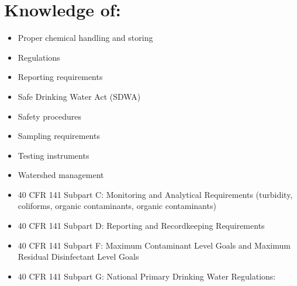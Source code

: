 \documentclass[10pt]{article}
\begin{document}
\section{Knowledge of:}
\begin{itemize}
  \item Proper chemical handling and storing

  \item Regulations

  \item Reporting requirements

  \item Safe Drinking Water Act (SDWA)

  \item Safety procedures

  \item Sampling requirements

  \item Testing instruments

  \item Watershed management

  \item 40 CFR 141 Subpart C: Monitoring and Analytical Requirements (turbidity, coliforms, organic contaminants, organic contaminants)

  \item 40 CFR 141 Subpart D: Reporting and Recordkeeping Requirements

  \item 40 CFR 141 Subpart F: Maximum Contaminant Level Goals and Maximum Residual Disinfectant Level Goals

  \item 40 CFR 141 Subpart G: National Primary Drinking Water Regulations:

\end{itemize}
\end{document}
